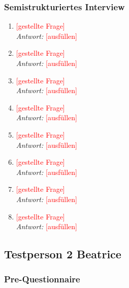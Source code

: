 \documentclass[../Main.tex]{subfiles}
\begin{document}
\subsubsection{Semistrukturiertes Interview}

\begin{enumerate}[label=\textbf{I\arabic*}, leftmargin=1.5cm, itemsep=1em]
    \item \textcolor{red}{[gestellte Frage]} \\
        \textit{Antwort:} \textcolor{red}{[ausfüllen]}

    \item \textcolor{red}{[gestellte Frage]} \\
        \textit{Antwort:} \textcolor{red}{[ausfüllen]}

    \item \textcolor{red}{[gestellte Frage]} \\
        \textit{Antwort:} \textcolor{red}{[ausfüllen]}

    \item \textcolor{red}{[gestellte Frage]} \\
        \textit{Antwort:} \textcolor{red}{[ausfüllen]}

    \item \textcolor{red}{[gestellte Frage]} \\
        \textit{Antwort:} \textcolor{red}{[ausfüllen]}

    \item \textcolor{red}{[gestellte Frage]} \\
        \textit{Antwort:} \textcolor{red}{[ausfüllen]}

    \item \textcolor{red}{[gestellte Frage]} \\
        \textit{Antwort:} \textcolor{red}{[ausfüllen]}

    \item \textcolor{red}{[gestellte Frage]} \\
        \textit{Antwort:} \textcolor{red}{[ausfüllen]}
\end{enumerate}

\subsection{Testperson 2 Beatrice}

\subsubsection{Pre-Questionnaire}
\end{document}
